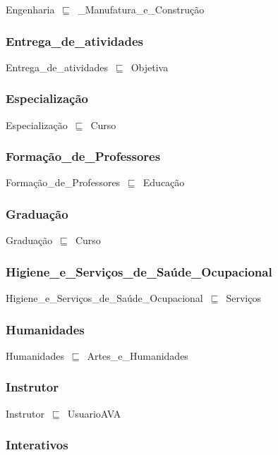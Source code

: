 \documentclass{article}
\begin{document}
Engenharia~\ensuremath{\sqsubseteq}~\_Manufatura\_e\_Construção~

\subsubsection*{Entrega\_de\_atividades}

Entrega\_de\_atividades~\ensuremath{\sqsubseteq}~Objetiva~

\subsubsection*{Especialização}

Especialização~\ensuremath{\sqsubseteq}~Curso~

\subsubsection*{Formação\_de\_Professores}

Formação\_de\_Professores~\ensuremath{\sqsubseteq}~Educação~

\subsubsection*{Graduação}

Graduação~\ensuremath{\sqsubseteq}~Curso~

\subsubsection*{Higiene\_e\_Serviços\_de\_Saúde\_Ocupacional}

Higiene\_e\_Serviços\_de\_Saúde\_Ocupacional~\ensuremath{\sqsubseteq}~Serviços~

\subsubsection*{Humanidades}

Humanidades~\ensuremath{\sqsubseteq}~Artes\_e\_Humanidades~

\subsubsection*{Instrutor}

Instrutor~\ensuremath{\sqsubseteq}~UsuarioAVA~

\subsubsection*{Interativos}
\end{document}
